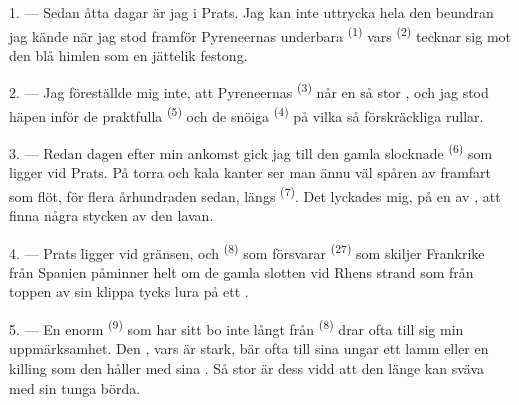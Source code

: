 
\VUsaut{4.0mm}
\VUsaut{3.0mm}

\VUsaut{3.0mm}

\VUsaut{3.0mm}

1. --- Sedan åtta dagar är jag i Prats. Jag kan inte uttrycka hela den
beundran jag kände när jag stod framför Pyreneernas underbara 
\textsuperscript{(1)} vars  \textsuperscript{(2)} tecknar sig mot
den blå himlen som en jättelik festong.

2. --- Jag föreställde mig inte, att Pyreneernas 
\textsuperscript{(3)} når en så stor , och jag stod häpen inför de
praktfulla  \textsuperscript{(5)} och de snöiga
 \textsuperscript{(4)} på vilka så förskräckliga
 rullar.

\VUsaut{3.0mm}
\VUsaut{3.0mm}

3. --- Redan dagen efter min ankomst gick jag till den gamla slocknade
 \textsuperscript{(6)} som ligger vid Prats. På
 torra och kala kanter ser man ännu väl spåren av
 framfart som flöt, för flera århundraden sedan, längs
 \textsuperscript{(7)}. Det lyckades mig, på en av
, att finna några stycken av den lavan.

4. --- Prats ligger vid gränsen, och 
\textsuperscript{(8)} som försvarar  \textsuperscript{(27)}
som skiljer Frankrike från Spanien påminner helt om de gamla slotten vid Rhens
strand som från toppen av sin klippa tycks lura på ett .

5. --- En enorm  \textsuperscript{(9)} som har sitt bo inte långt
från  \textsuperscript{(8)} drar ofta till sig min uppmärksamhet.
Den , vars  är stark, bär ofta till sina ungar ett
lamm eller en killing som den håller med sina . Så stor är dess
 vidd att den länge kan sväva med sin tunga börda.

